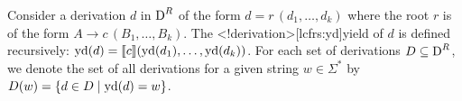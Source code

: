 \documentclass[../../document.tex]{subfiles}
\begin{document}
    \begin{definition}[Yield]
        Consider a derivation \(d\) in \(\operatorname{D}^R\) of the form \(d = r\,(d_1, \ldots, d_k)\) where the root \(r\) is of the form \(A \to c\,(B_1, \ldots, B_k)\).
        The <\lcfrs!derivation>[lcfrs:yd]{yield} of \(d\) is defined recursively: \(\operatorname{yd}(d) = \llbracket c\rrbracket(\operatorname{yd}(d_1), \ldots, \operatorname{yd}(d_k))\).
        For each set of derivations \(D \subseteq \operatorname{D}^R\), we denote the set of all derivations for a given string \(w \in \varSigma^*\) by \(D(w) = \{d\in D \mid \operatorname{yd}(d) = w\}\).
    \end{definition}



    \vspace{-\baselineskip}
\end{document}
